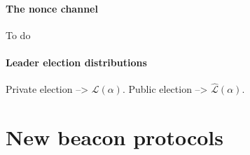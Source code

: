 
\paragraph{The nonce channel}
To do

\paragraph{Leader election distributions}
Private election --> $\mathcal{L}(\alpha)$. 
Public election --> $\hat{\mathcal{L}}(\alpha)$. 

\newcommand{\PublicElectionDistribution}{\hat{\mathcal{L}}}
\newcommand{\PrivateElectionDistribution}{\mathcal{L}}

\section{New beacon protocols}



